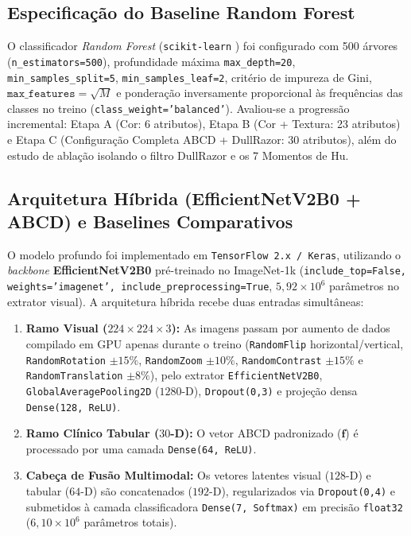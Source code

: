 \documentclass[12pt,a4paper]{article}
\begin{document}
\subsection{Especificação do Baseline Random Forest}
O classificador \textit{Random Forest} \cite{breiman2001} (\texttt{scikit-learn} \cite{pedregosa2011}) foi configurado com 500 árvores (\texttt{n\_estimators=500}), profundidade máxima \texttt{max\_depth=20}, \texttt{min\_samples\_split=5}, \texttt{min\_samples\_leaf=2}, critério de impureza de Gini, $\texttt{max\_features}=\sqrt{M}$ e ponderação inversamente proporcional às frequências das classes no treino (\texttt{class\_weight='balanced'}). Avaliou-se a progressão incremental: Etapa A (Cor: 6 atributos), Etapa B (Cor + Textura: 23 atributos) e Etapa C (Configuração Completa ABCD + DullRazor: 30 atributos), além do estudo de ablação isolando o filtro DullRazor e os 7 Momentos de Hu.

\subsection{Arquitetura Híbrida (EfficientNetV2B0 + ABCD) e Baselines Comparativos}
O modelo profundo foi implementado em \texttt{TensorFlow 2.x / Keras}, utilizando o \textit{backbone} \textbf{EfficientNetV2B0} \cite{tan2021} pré-treinado no ImageNet-1k \cite{deng2009} (\texttt{include\_top=False, weights='imagenet', include\_preprocessing=True}, $5{,}92 \times 10^6$ parâmetros no extrator visual). A arquitetura híbrida recebe duas entradas simultâneas:
\begin{enumerate}
    \item \textbf{Ramo Visual ($224 \times 224 \times 3$):} As imagens passam por aumento de dados compilado em GPU apenas durante o treino (\texttt{RandomFlip} horizontal/vertical, \texttt{RandomRotation} $\pm 15\%$, \texttt{RandomZoom} $\pm 10\%$, \texttt{RandomContrast} $\pm 15\%$ e \texttt{RandomTranslation} $\pm 8\%$), pelo extrator \texttt{EfficientNetV2B0}, \texttt{GlobalAveragePooling2D} ($1280$-D), \texttt{Dropout(0,3)} e projeção densa \texttt{Dense(128, ReLU)}.
    \item \textbf{Ramo Clínico Tabular ($30$-D):} O vetor ABCD padronizado ($\mathbf{f}$) é processado por uma camada \texttt{Dense(64, ReLU)}.
    \item \textbf{Cabeça de Fusão Multimodal:} Os vetores latentes visual ($128$-D) e tabular ($64$-D) são concatenados ($192$-D), regularizados via \texttt{Dropout(0,4)} e submetidos à camada classificadora \texttt{Dense(7, Softmax)} em precisão \texttt{float32} ($6{,}10 \times 10^6$ parâmetros totais).
\end{enumerate}
\end{document}
